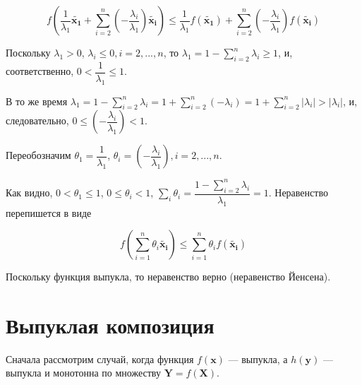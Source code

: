 	\begin{equation}
	f(\frac{1}{\lambda_1}\mathbf{\tilde{x_1}}  + \sum\limits_{i=2}^{n} (-\frac{\lambda_i}{\lambda_1} )  \mathbf{\tilde{x_i}})  \leqslant \frac{1}{\lambda_1}f(\mathbf{\tilde{x_1}})  + \sum\limits_{i=2}^{n} (-\frac{\lambda_i}{\lambda_1} )  f(\mathbf{\tilde{x_i}})
	\end{equation}
	
	Поскольку $\lambda_1 > 0$, $\lambda_i \leqslant 0, i=2,...,n$, то $\lambda_1 = 1 - \sum\limits_{i=2}^{n}\lambda_i \geqslant 1$, и, соответственно, $0 < \dfrac{1}{\lambda_1} \leqslant 1$. 
	
	В то же время $\lambda_1 = 1 - \sum\limits_{i=2}^{n}\lambda_i = 1 + \sum\limits_{i=2}^{n}(-\lambda_i) = 1 + \sum\limits_{i=2}^{n}\left| \lambda_i\right| > \left| \lambda_i\right|$, и, следовательно, $0 \leqslant (-\dfrac{\lambda_i}{\lambda_1}) < 1$.
	
	Переобозначим $\theta_1 = \dfrac{1}{\lambda_1}$, $\theta_i = (-\dfrac{\lambda_i}{\lambda_1}), i=2,...,n$. 
	
	Как видно, $0<\theta_1 \leqslant 1$, $0 \leqslant \theta_i < 1$, $\sum\limits_i \theta_i = \dfrac{1 - \sum\limits_{i=2}^{n}\lambda_i}{\lambda_1}=1$. Неравенство перепишется в виде
	
	\begin{equation}
	f( \sum\limits_{i=1}^{n} \theta_i \mathbf{\tilde{x_i}})  \leqslant \sum\limits_{i=1}^{n} \theta_i  f(\mathbf{\tilde{x_i}})
	\end{equation}
	
	Поскольку функция выпукла, то неравенство верно (неравенство Йенсена).
	
	\section{Выпуклая композиция}
	
	Сначала рассмотрим случай, когда функция $f(\mathbf{x})$ --- выпукла, а $h(\mathbf{y})$ --- выпукла и монотонна по множеству $\mathbf{Y} = f(\mathbf{X})$.

		

